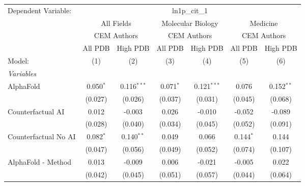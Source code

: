 \begingroup
\centering
\begin{tabular}{lcccccc}
   \tabularnewline \midrule \midrule
   Dependent Variable: & \multicolumn{6}{c}{ln1p\_cit\_1}\\
 & \multicolumn{2}{c}{All Fields} & \multicolumn{2}{c}{Molecular Biology} & \multicolumn{2}{c}{Medicine} \\
\cmidrule(lr){2-3} \cmidrule(lr){4-5} \cmidrule(lr){6-7}
 & \multicolumn{2}{c}{CEM Authors} & \multicolumn{2}{c}{CEM Authors} & \multicolumn{2}{c}{CEM Authors} \\
\cmidrule(lr){2-3} \cmidrule(lr){4-5} \cmidrule(lr){6-7}
 & \multicolumn{1}{c}{All PDB} & \multicolumn{1}{c}{High PDB} & \multicolumn{1}{c}{All PDB} & \multicolumn{1}{c}{High PDB} & \multicolumn{1}{c}{All PDB} & \multicolumn{1}{c}{High PDB} \\
\cmidrule(lr){2-2} \cmidrule(lr){3-3} \cmidrule(lr){4-4} \cmidrule(lr){5-5} \cmidrule(lr){6-6} \cmidrule(lr){7-7}
   Model:                                                     & (1)          & (2)           & (3)         & (4)           & (5)          & (6)\\  
   \midrule
   \emph{Variables}\\
   AlphaFold                                                  & 0.050$^{*}$  & 0.116$^{***}$ & 0.071$^{*}$ & 0.121$^{***}$ & 0.076        & 0.152$^{**}$\\   
                                                              & (0.027)      & (0.026)       & (0.037)     & (0.031)       & (0.045)      & (0.068)\\   
   Counterfactual AI                                          & 0.012        & -0.003        & 0.026       & -0.010        & -0.052       & -0.089\\   
                                                              & (0.028)      & (0.040)       & (0.034)     & (0.045)       & (0.052)      & (0.091)\\   
   Counterfactual No AI                                       & 0.082$^{*}$  & 0.140$^{**}$  & 0.049       & 0.066         & 0.144$^{*}$  & 0.144\\   
                                                              & (0.047)      & (0.056)       & (0.049)     & (0.052)       & (0.074)      & (0.107)\\   
   AlphaFold - Method                                         & 0.013        & -0.009        & 0.006       & -0.021        & -0.005       & 0.022\\   
                                                              & (0.042)      & (0.045)       & (0.051)     & (0.057)       & (0.044)      & (0.064)\\   

\end{tabular}
